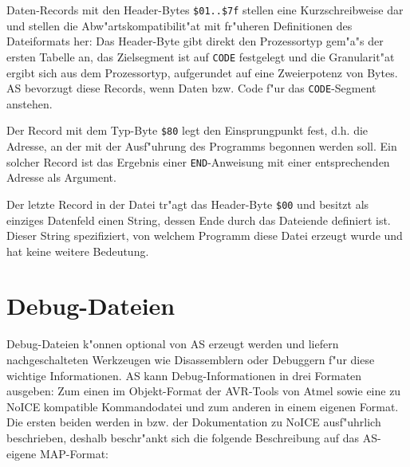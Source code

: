 \documentclass[12pt,a4paper,twoside]{report}
\newcommand{\tty}[1]{{\tt #1}}
\newcommand{\asname}{AS}
\begin{document}
\par
Daten-Records mit den Header-Bytes \verb!$01..$7f! stellen eine
Kurzschreibweise dar und stellen die Abw"artskompatibilit"at mit fr"uheren
Definitionen des Dateiformats her: Das Header-Byte gibt direkt den
Prozessortyp gem"a"s der ersten Tabelle an, das Zielsegment ist auf \tty{CODE}
festgelegt und die Granularit"at ergibt sich aus dem Prozessortyp,
aufgerundet auf eine Zweierpotenz von Bytes.  \asname{} bevorzugt diese Records,
wenn Daten bzw. Code f"ur das \tty{CODE}-Segment anstehen.
\par
Der Record mit dem Typ-Byte \verb!$80! legt den Einsprungpunkt fest, d.h.
die Adresse, an der mit der Ausf"uhrung des Programms begonnen werden
soll.  Ein solcher Record ist das Ergebnis einer \tty{END}-Anweisung mit
einer entsprechenden Adresse als Argument.
\par
Der letzte Record in der Datei tr"agt das Header-Byte \verb!$00! und besitzt
als einziges Datenfeld einen String, dessen Ende durch das Dateiende
definiert ist.  Dieser String spezifiziert, von welchem Programm diese
Datei erzeugt wurde und hat keine weitere Bedeutung.


\section{Debug-Dateien}\label{SectDebugFormat}

Debug-Dateien k"onnen optional von \asname{} erzeugt werden und liefern
nachgeschalteten Werkzeugen wie Disassemblern oder Debuggern f"ur diese
wichtige Informationen.  \asname{} kann Debug-Informationen in drei Formaten
ausgeben: Zum einen im Objekt-Format der AVR-Tools von Atmel sowie eine zu
NoICE kompatible Kommandodatei und zum anderen in einem eigenen Format.
Die ersten beiden werden in \cite{AVRObj} bzw. der Dokumentation zu
NoICE ausf"uhrlich beschrieben, deshalb beschr"ankt sich die folgende
Beschreibung auf das \asname{}-eigene MAP-Format:
\end{document}
